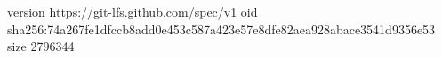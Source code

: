 version https://git-lfs.github.com/spec/v1
oid sha256:74a267fe1dfccb8add0e453c587a423e57e8dfe82aea928abace3541d9356e53
size 2796344
